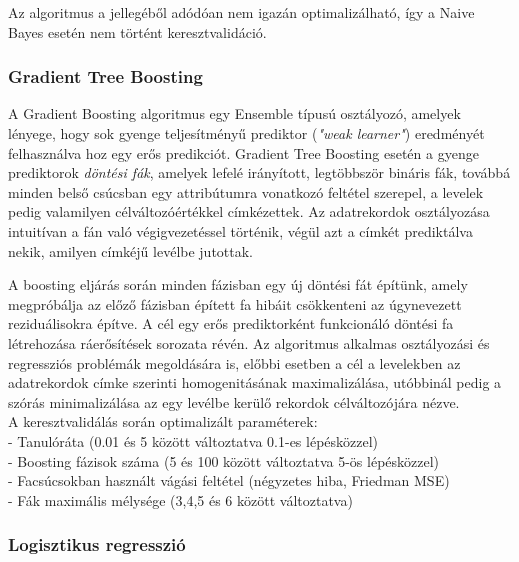 \documentclass[12pt]{article}
\begin{document}
Az algoritmus a jellegéből adódóan nem igazán optimalizálható, így a Naive Bayes esetén nem történt keresztvalidáció.

\subsubsection{Gradient Tree Boosting}

A Gradient Boosting algoritmus egy Ensemble típusú osztályozó, amelyek lényege, hogy sok gyenge teljesítményű prediktor (\textit{"weak learner"}) eredményét felhasználva hoz egy erős predikciót.\cite{friedman} Gradient Tree Boosting esetén a gyenge prediktorok \textit{döntési fák}, amelyek lefelé irányított, legtöbbször bináris fák, továbbá minden belső csúcsban egy attribútumra vonatkozó feltétel szerepel, a levelek pedig valamilyen célváltozóértékkel címkézettek. Az adatrekordok osztályozása intuitívan a fán való végigvezetéssel történik, végül azt a címkét prediktálva nekik, amilyen címkéjű levélbe jutottak.

A boosting eljárás során minden fázisban egy új döntési fát építünk, amely megpróbálja az előző fázisban épített fa hibáit csökkenteni az úgynevezett reziduálisokra építve. A cél egy erős prediktorként funkcionáló döntési fa létrehozása ráerősítések sorozata révén. Az algoritmus alkalmas osztályozási és regressziós problémák megoldására is, előbbi esetben a cél a levelekben az adatrekordok címke szerinti homogenitásának maximalizálása, utóbbinál pedig a szórás minimalizálása az egy levélbe kerülő rekordok célváltozójára nézve. \\



\noindent A keresztvalidálás során optimalizált paraméterek: \\
- Tanulóráta (0.01 és 5 között változtatva 0.1-es lépésközzel)\\
- Boosting fázisok száma (5 és 100 között változtatva 5-ös lépésközzel)\\
- Facsúcsokban használt vágási feltétel (négyzetes hiba, Friedman MSE) \\
- Fák maximális mélysége (3,4,5 és 6 között változtatva) \\

\subsubsection{Logisztikus regresszió}
\end{document}
